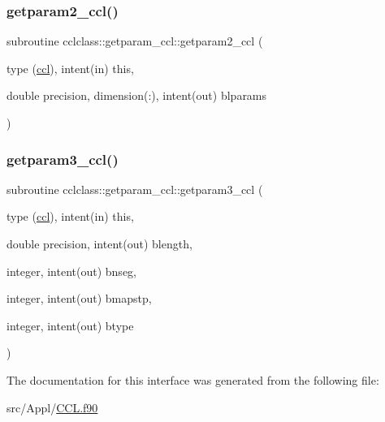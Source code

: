 \mbox{\label{interfacecclclass_1_1getparam__ccl_a5cc1f3e82f0e111c1aea9724639eeb24}} 
\subsubsection{\texorpdfstring{getparam2\_ccl()}{getparam2\_ccl()}}
{\footnotesize\ttfamily subroutine cclclass\+::getparam\+\_\+ccl\+::getparam2\+\_\+ccl (\begin{DoxyParamCaption}\item[{type (\mbox{\hyperlink{namespacecclclass_structcclclass_1_1ccl}{ccl}}), intent(in)}]{this,  }\item[{double precision, dimension(\+:), intent(out)}]{blparams }\end{DoxyParamCaption})}

\mbox{\label{interfacecclclass_1_1getparam__ccl_a71c4ce8f8b3151ae5aca125adccfc70d}} 
\subsubsection{\texorpdfstring{getparam3\_ccl()}{getparam3\_ccl()}}
{\footnotesize\ttfamily subroutine cclclass\+::getparam\+\_\+ccl\+::getparam3\+\_\+ccl (\begin{DoxyParamCaption}\item[{type (\mbox{\hyperlink{namespacecclclass_structcclclass_1_1ccl}{ccl}}), intent(in)}]{this,  }\item[{double precision, intent(out)}]{blength,  }\item[{integer, intent(out)}]{bnseg,  }\item[{integer, intent(out)}]{bmapstp,  }\item[{integer, intent(out)}]{btype }\end{DoxyParamCaption})}



The documentation for this interface was generated from the following file\+:\begin{DoxyCompactItemize}
\item 
src/\+Appl/\mbox{\hyperlink{_c_c_l_8f90}{C\+C\+L.\+f90}}\end{DoxyCompactItemize}
